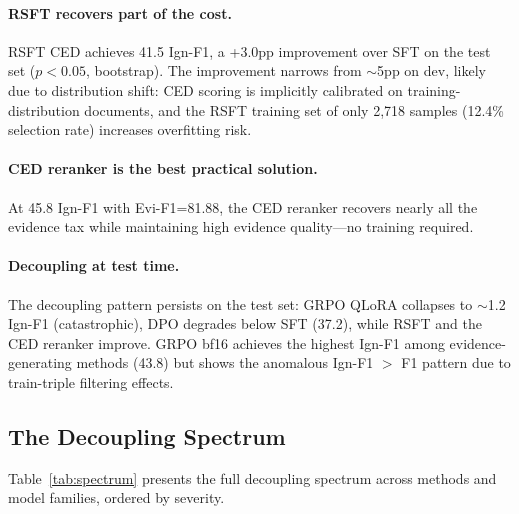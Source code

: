 \documentclass[11pt,a4paper]{article}
\begin{document}
\paragraph{RSFT recovers part of the cost.} RSFT CED achieves 41.5 Ign-F1, a +3.0pp improvement over SFT on the test set ($p<0.05$, bootstrap). The improvement narrows from $\sim$5pp on dev, likely due to distribution shift: CED scoring is implicitly calibrated on training-distribution documents, and the RSFT training set of only 2,718 samples (12.4\% selection rate) increases overfitting risk.

\paragraph{CED reranker is the best practical solution.} At 45.8 Ign-F1 with Evi-F1=81.88, the CED reranker recovers nearly all the evidence tax while maintaining high evidence quality---no training required.

\paragraph{Decoupling at test time.} The decoupling pattern persists on the test set: GRPO QLoRA collapses to $\sim$1.2 Ign-F1 (catastrophic), DPO degrades below SFT (37.2), while RSFT and the CED reranker improve. GRPO bf16 achieves the highest Ign-F1 among evidence-generating methods (43.8) but shows the anomalous Ign-F1 $>$ F1 pattern due to train-triple filtering effects.

\subsection{The Decoupling Spectrum}
\label{sec:decoupling}

Table~\ref{tab:spectrum} presents the full decoupling spectrum across methods and model families, ordered by severity.
\end{document}
